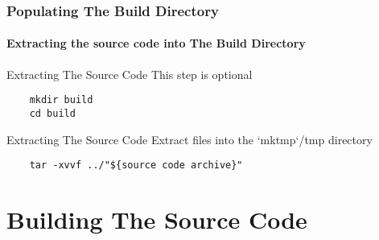 \documentclass[12pt,hyperref={pdfpagelabels=true}]{beamer}
\begin{document}
\begin{frame}[fragile]
  \frametitle{Populating The Build Directory}
  \framesubtitle{Extracting the source code into The Build Directory}
  \lstset{language=sh}

  \pause

  \begin{alertblock}{Extracting The Source Code}
    This step is optional
  \end{alertblock}

  \pause

  \begin{lstlisting}
    mkdir build
    cd build
  \end{lstlisting}

  \pause

  \begin{block}{Extracting The Source Code}
    Extract files into the `mktmp`/tmp directory
  \end{block}

  \pause

  \begin{lstlisting}
    tar -xvvf ../"${source code archive}"
  \end{lstlisting}
\end{frame}

\section{Building The Source Code}
\end{document}
